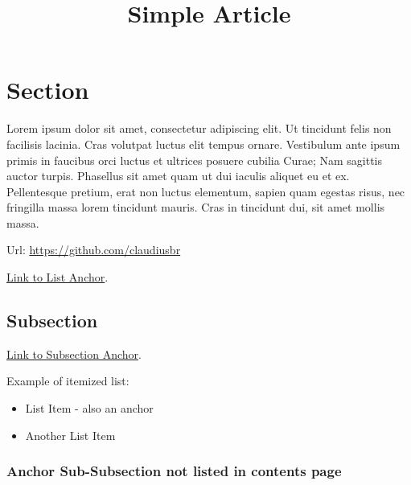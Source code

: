 \documentclass[a4paper,12pt]{article}
\title{Simple Article}
\begin{document}
\maketitle

\tableofcontents
\newpage
	
	
\section{Section} \label{sec:Step2}
  Lorem ipsum dolor sit amet, consectetur adipiscing elit. Ut tincidunt felis
  non facilisis lacinia. Cras volutpat luctus elit tempus ornare. Vestibulum
  ante ipsum primis in faucibus orci luctus et ultrices posuere cubilia Curae;
  Nam sagittis auctor turpis. Phasellus sit amet quam ut dui iaculis aliquet eu
  et ex. Pellentesque pretium, erat non luctus elementum, sapien quam egestas
  risus, nec fringilla massa lorem tincidunt mauris. Cras in tincidunt dui, sit
  amet mollis massa.

  Url: \url{https://github.com/claudiusbr}

  \hyperref[sec:Step2]{Link to List Anchor}.

	
\subsection{Subsection}

  
  \hyperlink{LinkToSubsection}{Link to Subsection Anchor}.
  
  Example of itemized list:
  \begin{itemize}
          \label{sec:Step2}
          \item
            List Item - also an anchor
          \item
            Another List Item
  \end{itemize}	
	

\hypertarget{LinkToSubsection}{
	\subsubsection*{Anchor Sub-Subsection not listed in contents page}
}
\end{document}
